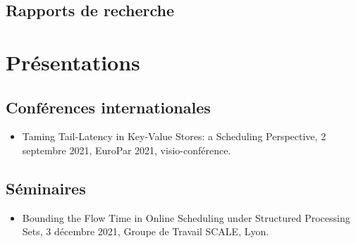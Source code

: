 \documentclass[12pt]{article}
\begin{document}

\subsection*{Rapports de recherche}




\section*{Présentations}

\subsection*{Conférences internationales}

\begin{itemize}
  \item \foreignlanguage{english}{Taming Tail-Latency in Key-Value Stores: a Scheduling
  Perspective}, 2 septembre 2021, EuroPar 2021, visio-conférence.
\end{itemize}

\subsection*{Séminaires}

\begin{itemize}
  \item \foreignlanguage{english}{Bounding the Flow Time in Online Scheduling under Structured
  Processing Sets}, 3 décembre 2021, Groupe de Travail SCALE, Lyon.
\end{itemize}
\end{document}
